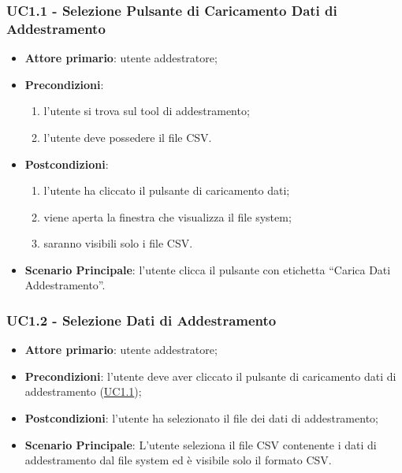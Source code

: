		\subsubsection{UC1.1 - Selezione Pulsante di Caricamento Dati di Addestramento}
		\begin{itemize}
			\item\textbf{Attore primario}: utente addestratore;
			\item\textbf{Precondizioni}: 
				\begin{enumerate}
					\item l’utente si trova sul tool di addestramento;
					\item l’utente deve possedere il file CSV.
				\end{enumerate}
			\item\textbf{Postcondizioni}:
				\begin{enumerate}
					\item l’utente ha cliccato il pulsante di caricamento dati;
					\item viene aperta la finestra che visualizza il file system\glo; 
					\item saranno visibili solo i file CSV.
				\end{enumerate}
			\item\textbf{Scenario Principale}: l’utente clicca il pulsante con etichetta “Carica Dati Addestramento”.
		\end{itemize}
		
		\label{par:UC1.2}
		\subsubsection{UC1.2 - Selezione Dati di Addestramento }
		\begin{itemize}
			\item\textbf{Attore primario}: utente addestratore;
			\item\textbf{Precondizioni}: l’utente deve aver cliccato il pulsante di caricamento dati di addestramento (\hyperref[par:UC1.1]{UC1.1});
			\item\textbf{Postcondizioni}: l’utente ha selezionato il file dei dati di addestramento;
			\item\textbf{Scenario Principale}: L’utente seleziona il file CSV contenente i dati di addestramento dal file system ed è visibile solo il formato CSV.
		\end{itemize}
		
		\label{par:UC1.3}
